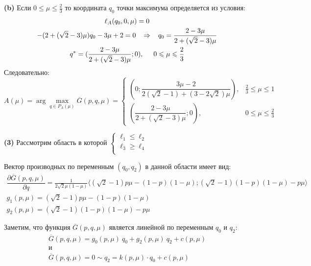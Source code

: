 \textbf{(b)}
Если $0 \leqslant \mu \leqslant \frac{2}{3}$ то координата $q_0$ точки 
максимума определяется из условия: 	
\begin{gather*}
	\ell_A(q_0,0,\mu)=0	
	\\
	-(2+(\sqrt{2}-3)\mu)q_0
	-3\mu+2=0	
	\hspace{3mm} \Rightarrow \hspace{3mm}
	q_0=\frac{2-3\mu}{2+(\sqrt{2}-3)\mu}	
	\\
	q^*= (\dfrac{2-3\mu}{2+(\sqrt{2}-3)\mu};0), 
	\hspace{5mm} 0 \leqslant \mu \leqslant \frac{2}{3}	
\end{gather*}
Следовательно:
\begin{equation} 
	\label{eq:A_point}
	A(\mu) = \arg \max \limits_{q\in P_A(\mu)} \overline G(p,q,\mu) = 
	\begin{cases}
		(0;\dfrac{3\mu-2}{2(\sqrt{2}-1)+(3-2\sqrt{2})\mu}), & 
		\frac{2}{3} \leqslant \mu \leqslant 1 
		\\
		(\dfrac{2-3\mu}{2+(\sqrt{2}-3)\mu};0), & 
		0 \leqslant \mu \leqslant \frac{2}{3}	
	\end{cases}
\end{equation}


\textbf{(3)}
Рассмотрим область в которой
$
\begin{cases}
	\ell_1 \leqslant \ell_2 \\	
	\ell_3 \geqslant \ell_4 \\
\end{cases}	
$

Вектор производных по переменным $(q_0,q_2)$ в данной области имеет вид:
\begin{gather*}
	\dfrac{\partial \overline{G}(p,q,\mu)}{\partial q}=
	\frac{1}{2\sqrt{2}\mu(1-\mu)}
	\big \langle 
		(\sqrt{2} - 1)p\mu -(1-p)(1-\mu);
		(\sqrt{2} - 1)(1-p)(1-\mu) - p\mu			
	\big \rangle
	\\
	g_1(p, \mu)=(\sqrt{2} - 1)p\mu -(1-p)(1-\mu) 
	\\
	g_2(p, \mu)=(\sqrt{2} - 1)(1-p)(1-\mu) - p\mu
\end{gather*}

Заметим, что функция $\overline{G}(p,q,\mu)$
является линейной по переменным $q_0$ и $q_2$:
\begin{gather*}
	\overline{G}(p,q,\mu)=g_0(p,\mu) \: q_0+g_2(p,\mu) \: q_2+c(p,\mu)
	\\
	\textrm{и}
	\\
	\overline{G}(p,q,\mu) = 0 \sim q_2 = k(p, \mu) \cdot q_0 + c(p, \mu)	
\end{gather*}
	
